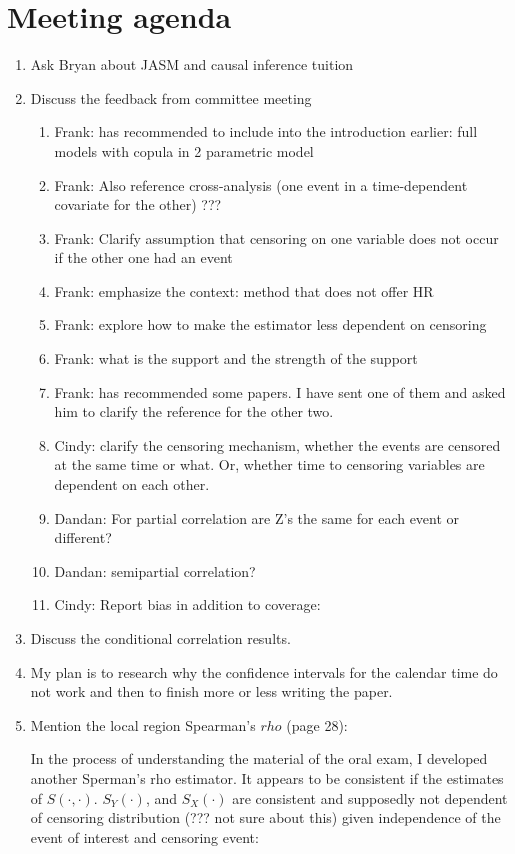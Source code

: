 \documentclass[]{article}
\begin{document}
\section{Meeting agenda}
\begin{enumerate}
  \item Ask Bryan about JASM and causal inference tuition
  \item Discuss the feedback from committee meeting
  \begin{enumerate}
    \item Frank: has recommended to include into the introduction earlier: full models with copula in 2 parametric model
    \item Frank: Also reference cross-analysis (one event in a time-dependent covariate for the other) ???
    \item Frank: Clarify assumption that censoring on one variable does not occur if the other one had an event
    \item Frank: emphasize the context: method that does not offer HR
    \item Frank: explore how to make the estimator less dependent on censoring
    \item Frank: what is the support and the strength of the support
    \item Frank: has recommended some papers. I have sent one of them and asked him to clarify the reference for the other two.
    \item Cindy: clarify the censoring mechanism, whether the events are censored at the same time or what. Or, whether time to censoring variables are dependent on each other.
    \item Dandan: For partial correlation are Z's the same for each event or different?
    \item Dandan: semipartial correlation?
    \item Cindy: Report bias in addition to coverage:
  \end{enumerate}
  \item Discuss the conditional correlation results.
  \item My plan is to research why the confidence intervals for the calendar time do not work and then to finish more or less writing the paper.
  \item Mention the local region Spearman's $rho$ (page 28):
  
  In the process of understanding the material of the oral exam, I developed another Sperman's rho estimator. It appears to be consistent if the estimates of $S(\cdot, \cdot)$. $S_Y(\cdot)$, and $S_X(\cdot)$ are consistent and supposedly not dependent of censoring distribution (??? not sure about this) given independence of the event of interest and censoring event:


\end{enumerate}
\end{document}
